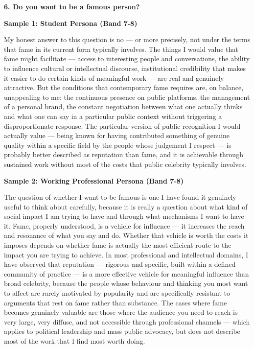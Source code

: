 \separator

\begin{ieltsquestion}
\textbf{6. Do you want to be a famous person?}
\end{ieltsquestion}
\textbf{Sample 1: Student Persona (Band 7-8)}

My honest answer to this question is no — or more precisely, not under the terms that fame in its current form typically involves. The things I would value that fame might facilitate — access to interesting people and conversations, the ability to influence cultural or intellectual discourse, institutional credibility that makes it easier to do certain kinds of meaningful work — are real and genuinely attractive. But the conditions that contemporary fame requires are, on balance, unappealing to me: the continuous presence on public platforms, the management of a personal brand, the constant negotiation between what one actually thinks and what one can say in a particular public context without triggering a disproportionate response. The particular version of public recognition I would actually value — being known for having contributed something of genuine quality within a specific field by the people whose judgement I respect — is probably better described as reputation than fame, and it is achievable through sustained work without most of the costs that public celebrity typically involves.

\textbf{Sample 2: Working Professional Persona (Band 7-8)}

The question of whether I want to be famous is one I have found it genuinely useful to think about carefully, because it is really a question about what kind of social impact I am trying to have and through what mechanisms I want to have it. Fame, properly understood, is a vehicle for influence — it increases the reach and resonance of what you say and do. Whether that vehicle is worth the costs it imposes depends on whether fame is actually the most efficient route to the impact you are trying to achieve. In most professional and intellectual domains, I have observed that reputation — rigorous and specific, built within a defined community of practice — is a more effective vehicle for meaningful influence than broad celebrity, because the people whose behaviour and thinking you most want to affect are rarely motivated by popularity and are specifically resistant to arguments that rest on fame rather than substance. The cases where fame becomes genuinely valuable are those where the audience you need to reach is very large, very diffuse, and not accessible through professional channels — which applies to political leadership and mass public advocacy, but does not describe most of the work that I find most worth doing.

